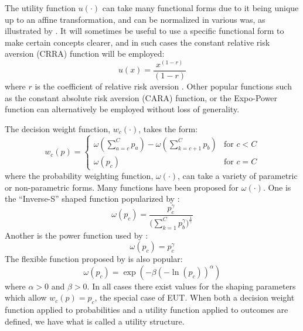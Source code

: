 \documentclass[../main.tex]{subfiles}
\begin{document}
The utility function $u(\cdot)$ can take many functional forms due to it being unique up to an affine transformation, and can be normalized in various was, as illustrated by \textcite{Hey1994}.
It will sometimes be useful to use a specific functional form to make certain concepts clearer, and in such cases the constant relative risk aversion (CRRA) function will be employed:
\begin{equation}
	\label{eq2:CRRA}
	u(x) = \frac{x^{(1-r)}}{(1-r)}
\end{equation}
\noindent where $r$ is the coefficient of relative risk aversion \parencite{Pratt1964}.
Other popular functions such as the constant absolute risk aversion (CARA) function, or the Expo-Power function \parencite{Saha1993} can alternatively be employed without loss of generality.

The decision weight function, $w_c(\cdot)$, takes the form:
\begin{equation}
	\label{eq2:dweight}
	w_c(p) =
	\begin{cases}
		\omega\left(\displaystyle\sum_{a=c}^C p_a\right) - \omega\left(\displaystyle\sum_{k=c+1}^C p_b\right) & \text{for } c<C \\
		\omega(p_c) & \text{for } c = C
	\end{cases}
\end{equation}
\noindent where the probability weighting function, $\omega(\cdot)$, can take a variety of parametric or non-parametric forms.
Many functions have been proposed for $\omega(\cdot)$.
One is the \enquote{Inverse-S} shaped function popularized by \textcite{Tversky1992}:
\begin{equation}
	\label{eq2:pw:kahneman}
	\omega(p_c) = \frac{p_c^\gamma}{\biggl(\sum\limits_{k=1}^{C} p_b^\gamma\biggr)^{ \frac{1}{\gamma} } }
\end{equation}
\noindent Another is the power function used by \textcite{Quiggin1982}:
\begin{equation}
	\label{eq2:pw:quiggin}
	\omega(p_c)=p_c^\gamma
\end{equation}
\noindent The flexible function proposed by \textcite{Prelec1998} is also popular:
\begin{equation}
	\label{eq2:pw:prelec}
	\omega(p_c)=\exp(-\beta(-\ln(p_c))^\alpha)
\end{equation}
\noindent where $\alpha > 0$ and $\beta > 0$.
In all cases there exist values for the shaping parameters which allow $w_c(p) = p_c$, the special case of EUT.
When both a decision weight function applied to probabilities and a utility function applied to outcomes are defined, we have what is called a utility structure.
\end{document}
